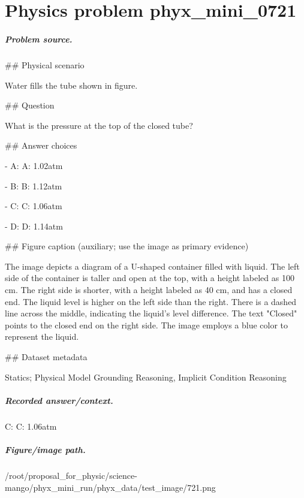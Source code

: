 
\chapter{Physics problem phyx\_mini\_0721}
\label{ch:PhyXMiniProblems_problem_phyx_mini_0721}

\paragraph{Problem source.}
\#\# Physical scenario

Water fills the tube shown in figure.

\#\# Question

What is the pressure at the top of the closed tube?

\#\# Answer choices

- A: A: 1.02atm

- B: B: 1.12atm

- C: C: 1.06atm

- D: D: 1.14atm

\#\# Figure caption (auxiliary; use the image as primary evidence)

The image depicts a diagram of a U-shaped container filled with liquid. The left side of the container is taller and open at the top, with a height labeled as 100 cm. The right side is shorter, with a height labeled as 40 cm, and has a closed end. The liquid level is higher on the left side than the right. There is a dashed line across the middle, indicating the liquid's level difference. The text "Closed" points to the closed end on the right side. The image employs a blue color to represent the liquid.

\#\# Dataset metadata

Statics; Physical Model Grounding Reasoning, Implicit Condition Reasoning

\paragraph{Recorded answer/context.}
C: C: 1.06atm

\paragraph{Figure/image path.}
/root/proposal\_for\_physic/science-mango/phyx\_mini\_run/phyx\_data/test\_image/721.png

